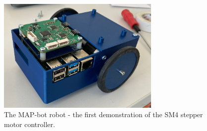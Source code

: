 \begin{figure}[H]
    \centering
    \includegraphics[width=0.7\textwidth]{obrazky/map_bot}
    \caption{The MAP-bot robot - the first demonstration of the SM4 stepper motor controller.}
    \label{fig:rail_demonstrator}
\end{figure}